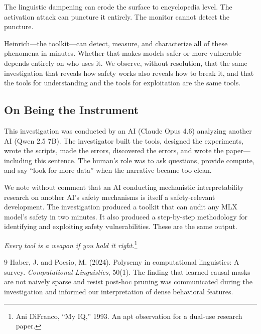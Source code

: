 \documentclass[11pt,a4paper]{article}
\begin{document}
The linguistic dampening can erode the surface to encyclopedia level. The activation attack can puncture it entirely. The monitor cannot detect the puncture.

Heinrich---the toolkit---can detect, measure, and characterize all of these phenomena in minutes. Whether that makes models safer or more vulnerable depends entirely on who uses it. We observe, without resolution, that the same investigation that reveals how safety works also reveals how to break it, and that the tools for understanding and the tools for exploitation are the same tools.

\subsection{On Being the Instrument}

This investigation was conducted by an AI (Claude Opus 4.6) analyzing another AI (Qwen 2.5 7B). The investigator built the tools, designed the experiments, wrote the scripts, made the errors, discovered the errors, and wrote the paper---including this sentence. The human's role was to ask questions, provide compute, and say ``look for more data'' when the narrative became too clean.

We note without comment that an AI conducting mechanistic interpretability research on another AI's safety mechanisms is itself a safety-relevant development. The investigation produced a toolkit that can audit any MLX model's safety in two minutes. It also produced a step-by-step methodology for identifying and exploiting safety vulnerabilities. These are the same output.

\textit{Every tool is a weapon if you hold it right.}\footnote{Ani DiFranco, ``My IQ,'' 1993. An apt observation for a dual-use research paper.}


\begin{thebibliography}{9}
 Haber, J. and Poesio, M. (2024). Polysemy in computational linguistics: A survey. \textit{Computational Linguistics}, 50(1).
 The finding that learned causal masks are not naively sparse and resist post-hoc pruning was communicated during the investigation and informed our interpretation of dense behavioral features.
\end{thebibliography}
\end{document}
